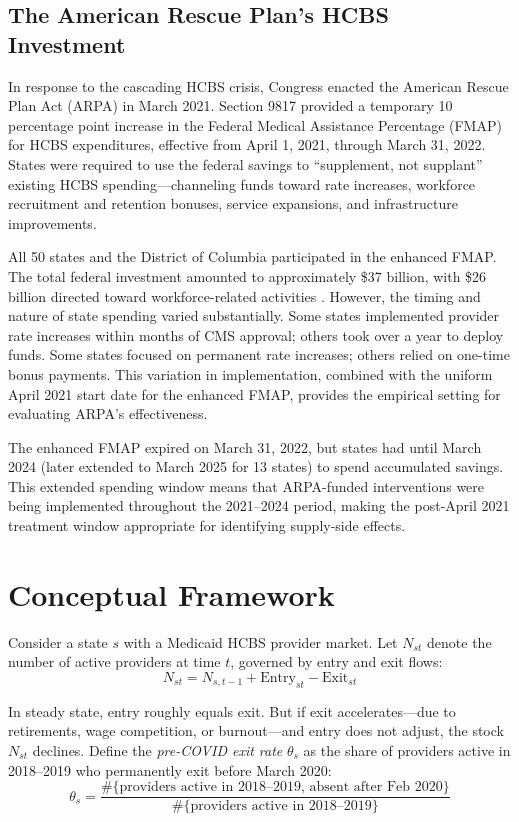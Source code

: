 \documentclass[12pt]{article}
\begin{document}
\subsection{The American Rescue Plan's HCBS Investment}

In response to the cascading HCBS crisis, Congress enacted the American Rescue Plan Act (ARPA) in March 2021. Section 9817 provided a temporary 10 percentage point increase in the Federal Medical Assistance Percentage (FMAP) for HCBS expenditures, effective from April 1, 2021, through March 31, 2022. States were required to use the federal savings to ``supplement, not supplant'' existing HCBS spending---channeling funds toward rate increases, workforce recruitment and retention bonuses, service expansions, and infrastructure improvements.

All 50 states and the District of Columbia participated in the enhanced FMAP. The total federal investment amounted to approximately \$37 billion, with \$26 billion directed toward workforce-related activities \citep{advancingstates2024}. However, the timing and nature of state spending varied substantially. Some states implemented provider rate increases within months of CMS approval; others took over a year to deploy funds. Some states focused on permanent rate increases; others relied on one-time bonus payments. This variation in implementation, combined with the uniform April 2021 start date for the enhanced FMAP, provides the empirical setting for evaluating ARPA's effectiveness.

The enhanced FMAP expired on March 31, 2022, but states had until March 2024 (later extended to March 2025 for 13 states) to spend accumulated savings. This extended spending window means that ARPA-funded interventions were being implemented throughout the 2021--2024 period, making the post-April 2021 treatment window appropriate for identifying supply-side effects.


\section{Conceptual Framework}

Consider a state $s$ with a Medicaid HCBS provider market. Let $N_{st}$ denote the number of active providers at time $t$, governed by entry and exit flows:
\begin{equation}
N_{st} = N_{s,t-1} + \text{Entry}_{st} - \text{Exit}_{st}
\end{equation}

In steady state, entry roughly equals exit. But if exit accelerates---due to retirements, wage competition, or burnout---and entry does not adjust, the stock $N_{st}$ declines. Define the \emph{pre-COVID exit rate} $\theta_s$ as the share of providers active in 2018--2019 who permanently exit before March 2020:
\begin{equation}
\theta_s = \frac{\#\{\text{providers active in 2018--2019, absent after Feb 2020}\}}{\#\{\text{providers active in 2018--2019}\}}
\end{equation}
\end{document}
